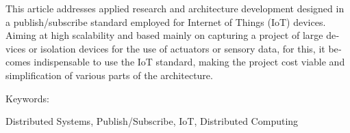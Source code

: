 \begin{resumo}[Abstract]
  \begin{otherlanguage}{english}
    This article addresses applied research and architecture development designed in a publish/subscribe standard employed for Internet of Things (IoT) devices. Aiming at high scalability and based mainly on capturing a project of large devices or isolation devices for the use of actuators or sensory data, for this, it becomes indispensable to use the IoT standard, making the project cost viable and simplification of various parts of the architecture.

Keywords:

Distributed Systems, Publish/Subscribe, IoT, Distributed Computing
  \end{otherlanguage}
\end{resumo}
